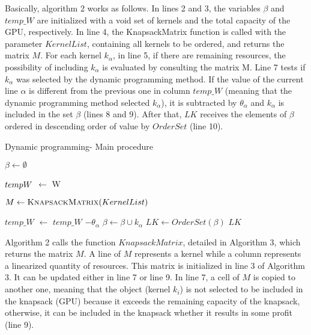 Basically, algorithm 2 works as follows. In lines 2 and 3, the variables $\beta$ and $temp\_W$ are initialized with a void set of kernels and the total capacity of the GPU, respectively.  In line 4, the  KnapsackMatrix function is called with the parameter $KernelList$, containing all kernels to be ordered, and  returns the matrix $M$. 
For each kernel $k_\alpha$, in line 5, if there are remaining resources,  the possibility of including  $k_\alpha$ is evaluated by consulting the matrix M. 
Line 7 tests if  $k_\alpha$ was selected  by the dynamic programming  method.
If the value of the current line $\alpha$ is different from the previous one  in column $temp\_W$ (meaning that the dynamic programming method selected $k_\alpha$), it is  subtracted by  $\theta_\alpha$ and  $k_\alpha$ is included in the set $\beta$ (lines 8 and 9). After that, $LK$ receives  the elements of  $\beta$  ordered in descending order of value  by $OrderSet$ (line 10).

\begin{algorithm}[htb]
\caption{Dynamic programming-  Main procedure}\label{alg:dynamic}
\footnotesize{
\begin{algorithmic}[1]
 \State $ \beta  \gets \emptyset$ 
 
 \State $temp\-W$  $\gets$ W
 
 \State $M \gets \Call{KnapsackMatrix}{KernelList}$
 
 
        \State $temp\_W$ $ \gets$ $temp\_W$ $ -  \theta_\alpha$
  \State $\beta\gets\beta \cup k_{\alpha}$
   \EndIf
  \EndIf
 \EndFor
 \State $LK \gets OrderSet(\beta)$
 \State \Return $LK$
\EndFunction
\end{algorithmic}
}
\end{algorithm}

Algorithm 2 calls the function $KnapsackMatrix$, detailed in Algorithm 3,  which returns the matrix $M$.  A line of $M$ represents a kernel  while a column  represents a linearized  quantity of resources. This matrix is initialized in line 3 of Algorithm 3. It can be updated either in line 7  or line 9. In line 7,  a  cell of $M$ is copied to another one,   meaning that the object  (kernel $k_i$) is not selected to be included in  the knapsack (GPU) because it exceeds the remaining capacity of the knapsack, otherwise, it can be  included in the knapsack whether it results in some profit (line 9).

